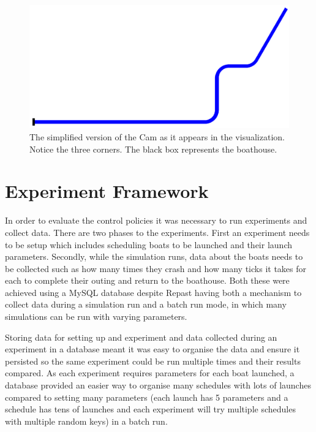       \begin{figure}
      \begin{center}
        \includegraphics[scale=0.35]{images/SimplifiedCam.png}
        \caption{The simplified version of the Cam as it appears in the visualization. Notice the three corners. The black box represents the boathouse.}
        \label{techissues:fig:simplecam}
      \end{center}
      \end{figure}
      
  \section{Experiment Framework}\label{techissues:experiment_framework}
  In order to evaluate the control policies it was necessary to run
  experiments and collect data. There are two phases to the
  experiments. First an experiment needs to be setup which includes
  scheduling boats to be launched and their launch
  parameters. Secondly, while the simulation runs, data about the boats needs to be collected such as how many times they crash and how many ticks it takes for each to complete their outing and return to the boathouse. Both these were achieved using a MySQL database despite Repast having both a mechanism to collect data during a simulation run and a batch run mode, in which many simulations can be run with varying parameters. 
  
  Storing data for setting up and experiment and data collected during an experiment in a database meant it was easy to organise the data and ensure it persisted so the same experiment could be run multiple times and their results compared. As each experiment requires parameters for each boat launched, a database provided an easier way to organise many schedules with lots of launches compared to setting many parameters (each launch has 5 parameters and a schedule has tens of launches and each experiment will try multiple schedules with multiple random keys) in a batch run. 
  
